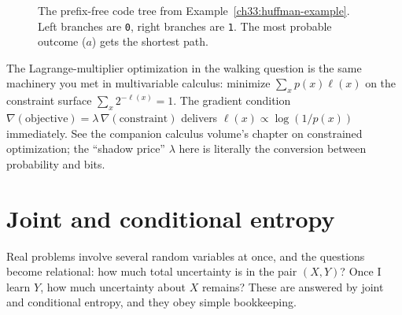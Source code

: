 \begin{figure}[htbp]
\centering
{}
\caption{The prefix-free code tree from Example~\ref{ch33:huffman-example}. Left branches are \texttt{0}, right branches are \texttt{1}. The most probable outcome ($a$) gets the shortest path.}
\label{ch33:fig-huffman}
\end{figure}


\begin{connectionbox}
The Lagrange-multiplier optimization in the walking question is the same machinery you met in
multivariable calculus: minimize $\sum_x p(x) \ell(x)$ on the constraint surface $\sum_x 2^{-\ell(x)} = 1$. The
gradient condition $\nabla(\text{objective}) = \lambda\,\nabla(\text{constraint})$ delivers $\ell(x) \propto
\log(1/p(x))$ immediately. See the companion calculus volume's chapter on constrained optimization; the
``shadow price'' $\lambda$ here is literally the conversion between probability and bits.
\end{connectionbox}

\section{Joint and conditional entropy}
\label{ch33:joint-conditional}

Real problems involve several random variables at once, and the questions become relational: how much
total uncertainty is in the pair $(X,Y)$? Once I learn $Y$, how much uncertainty about $X$ remains? These
are answered by joint and conditional entropy, and they obey simple bookkeeping.

